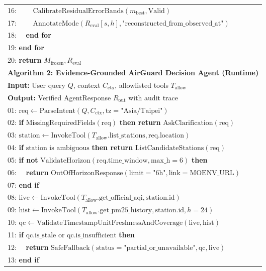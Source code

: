 \begin{figure}[!t]
{\begin{tabular}{@{}l@{}}
16: \ \ \ \ $\text{CalibrateResidualErrorBands}(m_{\text{best}}, \text{Valid})$\\
17: \ \ \ \ $\text{AnnotateMode}(R_{\text{eval}}[s,h], \text{"reconstructed\_from\_observed\_at"})$\\
18: \ \ \textbf{end for}\\
19: \textbf{end for}\\
20: \textbf{return} $M_{\text{frozen}}, R_{\text{eval}}$\\
\midrule
\textbf{Algorithm 2: Evidence-Grounded AirGuard Decision Agent (Runtime)}\\
\textbf{Input:} User query $Q$, context $C_{\text{ctx}}$, allowlisted tools $T_{\text{allow}}$\\
\textbf{Output:} Verified AgentResponse $R_{\text{out}}$ with audit trace\\
\midrule
01: $\text{req} \leftarrow \text{ParseIntent}(Q, C_{\text{ctx}}, \text{tz}=\text{"Asia/Taipei"})$\\
02: \textbf{if} $\text{MissingRequiredFields}(\text{req})$ \textbf{then return} $\text{AskClarification}(\text{req})$\\
03: $\text{station} \leftarrow \text{InvokeTool}(T_{\text{allow}}.\text{list\_stations}, \text{req.location})$\\
04: \textbf{if} $\text{station is ambiguous}$ \textbf{then return} $\text{ListCandidateStations}(\text{req})$\\
05: \textbf{if not} $\text{ValidateHorizon}(\text{req.time\_window}, \text{max\_h}=6)$ \textbf{then}\\
06: \ \ \textbf{return} $\text{OutOfHorizonResponse}(\text{limit}=\text{"6h"}, \text{link}=\text{MOENV\_URL})$\\
07: \textbf{end if}\\
08: $\text{live} \leftarrow \text{InvokeTool}(T_{\text{allow}}.\text{get\_official\_aqi}, \text{station.id})$\\
09: $\text{hist} \leftarrow \text{InvokeTool}(T_{\text{allow}}.\text{get\_pm25\_history}, \text{station.id}, h=24)$\\
10: $\text{qc} \leftarrow \text{ValidateTimestampUnitFreshnessAndCoverage}(\text{live}, \text{hist})$\\
11: \textbf{if} $\text{qc.is\_stale or qc.is\_insufficient}$ \textbf{then}\\
12: \ \ \textbf{return} $\text{SafeFallback}(\text{status}=\text{"partial\_or\_unavailable"}, \text{qc}, \text{live})$\\
13: \textbf{end if}\\

\end{tabular}}
\end{figure}
